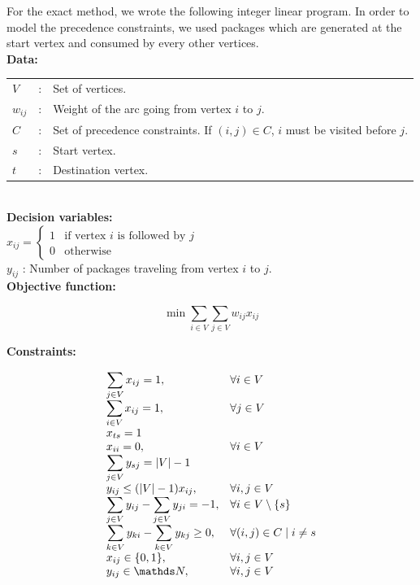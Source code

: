 \documentclass[]{article}
\begin{document}
    For the exact method, we wrote the following integer linear program. In order to model the precedence constraints, we used packages which are generated at the start vertex and consumed by every other vertices.\\
    
    \textbf{Data:}\\
    
    \begin{tabular}{lll}
	    $V$ & : & Set of vertices.\\ 
	    $w_{ij}$ & : & Weight of the arc going from vertex $i$ to $j$.\\
	    $C$ & : & Set of precedence constraints. If $(i,j) \in C$, $i$ must be visited before $j$.\\
	    $s$ & : & Start vertex.\\
	    $t$ & : & Destination vertex.
	\end{tabular}\\
    
    \textbf{Decision variables:}\\
    
    $x_{ij} = \begin{cases}
	    1 & \text{if vertex } i \text{ is followed by } j\\
	    0 & \text{otherwise}
    \end{cases}$\\
    
    $y_{ij}$ : Number of packages traveling from vertex $i$ to $j$.\\
    
    \textbf{Objective function:}
    
    $$\min \sum_{i \in V}\sum_{j \in V} w_{ij} x_{ij}$$
    
    \textbf{Constraints:}

    $$\begin{array}{ll}
        \displaystyle\sum_{j \in V} x_{ij} = 1, & \forall i \in V\\
        \displaystyle\sum_{i \in V} x_{ij} = 1, & \forall j \in V\\
        x_{ts} = 1 &\\
        x_{ii} = 0, & \forall i \in V\\
        \displaystyle\sum_{j \in V} y_{sj} = |V| - 1&\\
        y_{ij} \le (|V| - 1) x_{ij}, & \forall i, j \in V\\
        \displaystyle\sum_{j \in V} y_{ij} - \displaystyle\sum_{j \in V} y_{ji} = -1, & \forall i \in V\setminus\{s\}\\
        \displaystyle\sum_{k \in V} y_{ki} - \displaystyle\sum_{k \in V} y_{kj} \ge 0, & \forall (i,j) \in C \mid i \ne s\\
        x_{ij} \in \{0, 1\}, & \forall i,j \in V\\
        y_{ij} \in \N, & \forall i,j \in V\\
    \end{array}$$\\
    
\end{document}
